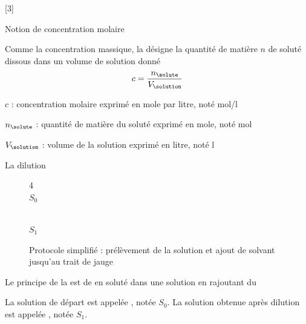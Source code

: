 [3]


\begin{doc}{Notion de concentration molaire}
  \begin{importants}
    Comme la concentration massique, la  désigne la quantité de matière $n$ de soluté dissous dans un volume de solution donné
    \begin{equation*}
      c = \dfrac{n_\solute}{V_\solution}
    \end{equation*}
  \end{importants}
  \begin{listePoints}
    \item $c$ : concentration molaire exprimé en mole par litre, noté \unit{\mole/\litre}
    \item $n_\solute$ : quantité de matière du soluté exprimé en mole, noté \unit{\mole}
    \item $V_\solution$ : volume de la solution exprimé en litre, noté \unit{\litre}
  \end{listePoints}
\end{doc}


\pasCorrection{\newpage\vspace*{-36pt}}
\begin{doc}{La dilution}
  \begin{figure}
    \vspace*{-34pt}
    \centering
    \begin{multicols}{4}
     \\[-0pt]
    \footnotesize{$S_0$}
    
    
    
     \\[-0pt]
    \footnotesize{$S_1$}
    \end{multicols}
    Protocole simplifié : prélèvement de la solution et ajout de solvant jusqu'au trait de jauge
  \end{figure}
  \vAligne{-40pt}
  
  \begin{importants}
    Le principe de la  est de  en soluté dans une solution en rajoutant du 
  \end{importants}
  La solution de départ est appelée , notée $S_0$.
  La solution obtenue après dilution est appelée , notée $S_1$.

  \strut
\end{doc}

